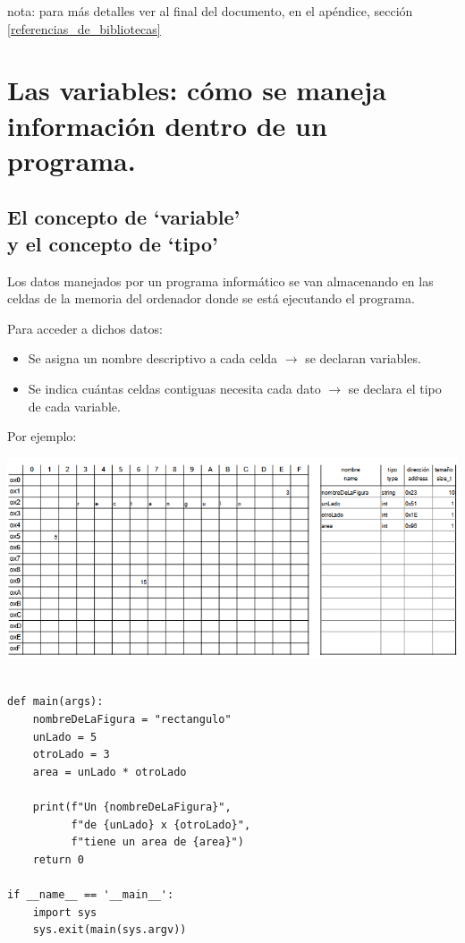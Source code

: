 \documentclass[spanish,12pt,a4paper,final,oneside]{book}
\begin{document}
nota: para más detalles ver al final del documento, en el apéndice, sección  \ref{referencias_de_bibliotecas}


\newpage
\chapter{Las variables: cómo se maneja información dentro de un programa.}

\section{El concepto de `variable' \\ y el concepto de `tipo'}

Los datos manejados por un programa informático se van almacenando en las celdas de la memoria del ordenador donde se está ejecutando el programa.

Para acceder a dichos datos:
\begin{itemize}
\item Se asigna un nombre descriptivo a cada celda $\rightarrow$ se declaran variables. 
\item Se indica cuántas celdas contiguas necesita cada dato  $\rightarrow$ se declara el tipo de cada variable.
\end{itemize}

Por ejemplo:

\includegraphics[width=\textwidth]{variables vs celdas de memoria}

\begin{lstlisting}[frame=single, caption=lenguaje Python]

def main(args):
    nombreDeLaFigura = "rectangulo"
    unLado = 5
    otroLado = 3
    area = unLado * otroLado
    
    print(f"Un {nombreDeLaFigura}",
          f"de {unLado} x {otroLado}",
          f"tiene un area de {area}")
    return 0

if __name__ == '__main__':
    import sys
    sys.exit(main(sys.argv))
    
\end{lstlisting}
\end{document}
